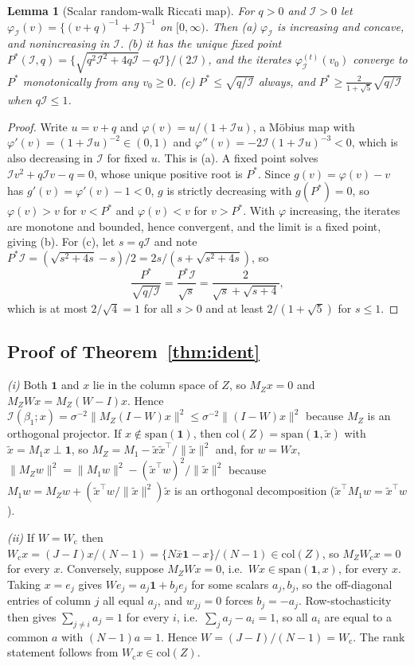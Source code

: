 \documentclass[12pt]{article}
\theoremstyle{plain}
\newtheorem{lemma}{Lemma}
\theoremstyle{definition}
\theoremstyle{remark}
\newcommand{\one}{\mathbf{1}}
\newcommand{\calI}{\mathcal{I}}
\newcommand{\Wc}{W_{\mathrm{c}}}
\newcommand{\T}{^{\top}}
\begin{document}
\begin{lemma}[Scalar random-walk Riccati map]\label{lem:riccati}
For $q>0$ and $\calI>0$ let $\varphi_{\calI}(v)=\{(v+q)^{-1}+\calI\}^{-1}$ on $[0,\infty)$. Then \textup{(a)} $\varphi_\calI$ is increasing and concave, and nonincreasing in $\calI$. \textup{(b)} it has the unique fixed point $P^\ast(\calI,q)=\{\sqrt{q^2\calI^2+4q\calI}-q\calI\}/(2\calI)$, and the iterates $\varphi_\calI^{(t)}(v_0)$ converge to $P^\ast$ monotonically from any $v_0\ge0$. \textup{(c)} $P^\ast\le\sqrt{q/\calI}$ always, and $P^\ast\ge\tfrac{2}{1+\sqrt5}\sqrt{q/\calI}$ when $q\calI\le1$.
\end{lemma}

\begin{proof}
Write $u=v+q$ and $\varphi(v)=u/(1+\calI u)$, a M\"obius map with $\varphi'(v)=(1+\calI u)^{-2}\in(0,1)$ and $\varphi''(v)=-2\calI(1+\calI u)^{-3}<0$, which is also decreasing in $\calI$ for fixed $u$. This is (a). A fixed point solves $\calI v^2+q\calI v-q=0$, whose unique positive root is $P^\ast$. Since $g(v)=\varphi(v)-v$ has $g'(v)=\varphi'(v)-1<0$, $g$ is strictly decreasing with $g(P^\ast)=0$, so $\varphi(v)>v$ for $v<P^\ast$ and $\varphi(v)<v$ for $v>P^\ast$. With $\varphi$ increasing, the iterates are monotone and bounded, hence convergent, and the limit is a fixed point, giving (b). For (c), let $s=q\calI$ and note $P^\ast\calI=(\sqrt{s^2+4s}-s)/2=2s/(s+\sqrt{s^2+4s})$, so
\[
\frac{P^\ast}{\sqrt{q/\calI}}=\frac{P^\ast\calI}{\sqrt{s}}=\frac{2}{\sqrt{s}+\sqrt{s+4}} ,
\]
which is at most $2/\sqrt4=1$ for all $s>0$ and at least $2/(1+\sqrt5)$ for $s\le1$.
\end{proof}

\subsection{Proof of Theorem~\ref{thm:ident}}

\emph{(i)} Both $\one$ and $x$ lie in the column space of $Z$, so $M_Zx=0$ and $M_ZWx=M_Z(W-I)x$. Hence $\calI(\beta_1;x)=\sigma^{-2}\|M_Z(I-W)x\|^2\le\sigma^{-2}\|(I-W)x\|^2$ because $M_Z$ is an orthogonal projector. If $x\notin\mathrm{span}(\one)$, then $\mathrm{col}(Z)=\mathrm{span}(\one,\tilde x)$ with $\tilde x=M_1x\perp\one$, so $M_Z=M_1-\tilde x\tilde x\T/\|\tilde x\|^2$ and, for $w=Wx$, $\|M_Zw\|^2=\|M_1w\|^2-(\tilde x\T w)^2/\|\tilde x\|^2$ because $M_1w=M_Zw+(\tilde x\T w/\|\tilde x\|^2)\tilde x$ is an orthogonal decomposition ($\tilde x\T M_1 w=\tilde x\T w$).

\emph{(ii)} If $W=\Wc$ then $\Wc x=(J-I)x/(N-1)=\{N\bar x\one-x\}/(N-1)\in\mathrm{col}(Z)$, so $M_Z\Wc x=0$ for every $x$. Conversely, suppose $M_ZWx=0$, i.e.\ $Wx\in\mathrm{span}(\one,x)$, for every $x$. Taking $x=e_j$ gives $We_j=a_j\one+b_je_j$ for some scalars $a_j,b_j$, so the off-diagonal entries of column $j$ all equal $a_j$, and $w_{jj}=0$ forces $b_j=-a_j$. Row-stochasticity then gives $\sum_{j\ne i}a_j=1$ for every $i$, i.e.\ $\sum_ja_j-a_i=1$, so all $a_i$ are equal to a common $a$ with $(N-1)a=1$. Hence $W=(J-I)/(N-1)=\Wc$. The rank statement follows from $\Wc x\in\mathrm{col}(Z)$.
\end{document}

